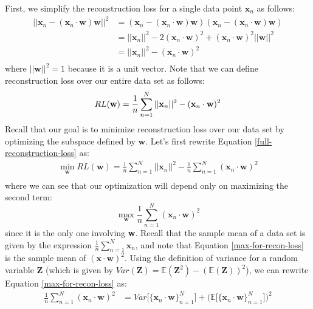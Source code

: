 First, we simplify the reconstruction loss for a single data point $\textbf{x}_n$ as follows:
\begin{align*}
	||\textbf{x}_{n} - (\textbf{x}_{n} \cdot \textbf{w})\textbf{w}||^{2} &= (\textbf{x}_{n} - (\textbf{x}_{n} \cdot \textbf{w})\textbf{w})(\textbf{x}_{n} - (\textbf{x}_{n} \cdot \textbf{w})\textbf{w}) \\
	&= ||\textbf{x}_{n}||^{2} - 2(\textbf{x}_{n} \cdot \textbf{w})^{2} + (\textbf{x}_{n} \cdot \textbf{w})^{2}||\textbf{w}||^{2} \\
	&= ||\textbf{x}_{n}||^{2} - (\textbf{x}_{n} \cdot \textbf{w})^{2} \\
\end{align*}
where $||\textbf{w}||^{2} = 1$ because it is a unit vector. Note that we can define reconstruction loss over our entire data set as follows:
\begin{equation} \label{full-reconstruction-loss}
    RL(\textbf{w}) = \frac{1}{n} \sum_{n=1}^{N} ||\textbf{x}_{n}||^{2} - (\textbf{x}_{n} \cdot \textbf{w})^{2} \\
\end{equation}
Recall that our goal is to minimize reconstruction loss over our data set by optimizing the subspace defined by $\textbf{w}$. Let's first rewrite Equation \ref{full-reconstruction-loss} as:
\begin{align*}
    \min_{\textbf{w}} RL(\textbf{w}) = \frac{1}{n} \sum_{n=1}^{N} ||\textbf{x}_{n}||^{2} - \frac{1}{n} \sum_{n=1}^{N} (\textbf{x}_{n} \cdot \textbf{w})^{2} \\
\end{align*}
where we can see that our optimization will depend only on maximizing the second term:
\begin{equation} \label{max-for-recon-loss}
    \max_{\textbf{w}} \frac{1}{n} \sum_{n=1}^{N} (\textbf{x}_{n} \cdot \textbf{w})^{2}
\end{equation}
since it is the only one involving \textbf{w}. Recall that the sample mean of a data set is given by the expression $\frac{1}{n} \sum_{n=1}^{N} \textbf{x}_{n}$, and note that Equation \ref{max-for-recon-loss} is the sample mean of $(\textbf{x} \cdot \textbf{w})^{2}$. Using the definition of variance for a random variable $\textbf{Z}$ (which is given by $Var(\textbf{Z}) = \mathbb{E}(\textbf{Z}^{2}) - (\mathbb{E}(\textbf{Z}))^{2}$), we can rewrite Equation \ref{max-for-recon-loss} as:
\begin{align*}
    \frac{1}{n} \sum_{n=1}^{N} (\textbf{x}_{n} \cdot \textbf{w})^{2} &= Var\big[\{\textbf{x}_{n} \cdot \textbf{w}\}_{n=1}^{N}\big] + \big( \mathbb{E} \big[\{\textbf{x}_{n} \cdot \textbf{w}\}_{n=1}^{N}\big] \big)^{2}
\end{align*}
